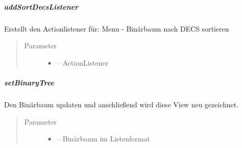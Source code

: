 \documentclass[letterpaper,10pt,ngerman]{sphinxmanual}
\begin{document}
\subparagraph{addSortDecsListener}
\label{\detokenize{com/linuxluigi/edu/view/View:addsortdecslistener}}

\begin{fulllineitems}
\label{\detokenize{com/linuxluigi/edu/view/View:com.linuxluigi.edu.view.View.addSortDecsListener(ActionListener)}}
Erstellt den Actionlistener für: Menu - Binärbaum nach DECS sortieren
\begin{quote}\begin{description}
\item[{Parameter}] \leavevmode\begin{itemize}
\item {} 
 -- ActionListener

\end{itemize}

\end{description}\end{quote}

\end{fulllineitems}



\subparagraph{setBinaryTree}
\label{\detokenize{com/linuxluigi/edu/view/View:setbinarytree}}

\begin{fulllineitems}
\label{\detokenize{com/linuxluigi/edu/view/View:com.linuxluigi.edu.view.View.setBinaryTree(Listlabel)}}
Den Binärbaum updaten und anschließend wird diese View neu gezeichnet.
\begin{quote}\begin{description}
\item[{Parameter}] \leavevmode\begin{itemize}
\item {} 
 -- Binärbaum im Listenformat

\end{itemize}

\end{description}\end{quote}

\end{fulllineitems}
\end{document}
